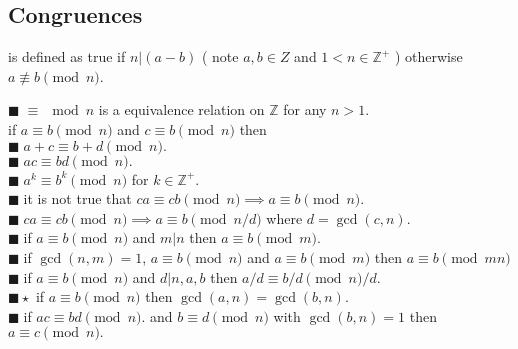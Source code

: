 \documentclass[11pt]{extarticle}
\newcommand{\Z}{\mathbb{Z}}
\newcommand{\snote}[1]{{\footnotesize(#1)}}
\newcommand{\tbx}[2][]{
\begin{tcolorbox}[enhanced,breakable,size=small,colback=black!2!white,title={#1},arc is angular, arc=1.5mm,
	drop fuzzy shadow]
	#2
\end{tcolorbox}
}
\newcommand{\y}{$\blacksquare\;$}
\begin{document}
\begin{multicols}{2}
\section{Congruences}
\tbx[$ a\equiv b\pmod{n} $]{ is defined as true if $ n|(a-b) $ \snote{ note $ a,b\in Z $ and $ 1<n\in \Z^+ $
} otherwise $ a\not\equiv b\pmod{n}  $.  }
\tbx[properties]{  
\y $ \equiv \mod{n}$ is a equivalence relation on $ \Z $ for any $ n>1. $ \\
if $ a\equiv b \pmod n $ and $ c\equiv b\pmod n $ then\\
\y $ a+c \equiv  b+d \pmod n.$ \\
\y $ ac\equiv bd\pmod n. $ \\
\y $ a^k\equiv b^k\pmod{n} $ for $ k\in \Z^+.$\\
\y it is not true that $ ca\equiv cb\pmod n\implies a\equiv b \pmod n $. \\
\y $ ca\equiv cb\pmod n\implies a\equiv b \pmod{n/d} $ where $ d=\gcd(c,n). $ \\
\y if $ a\equiv b\pmod n $ and $ m|n $ then $ a\equiv b \pmod m. $\\
\y if $ \gcd(n,m)=1 $, $ a\equiv b\pmod{n} $ and   $ a\equiv b\pmod{m} $ then $ a\equiv b \pmod{mn} $ \\ 
 \y if $ a\equiv b\pmod n $ and $ d|n,a,b $ then $ a/d\equiv b/d \pmod n/d. $\\
 $ \blacksquare\star$     if $ a\equiv b\pmod n $ then $ \gcd(a,n)=\gcd(b,n) .$\\
  \y if $ ac\equiv bd\pmod n. $ and $ b\equiv d\pmod n $ with $ \gcd(b,n)=1 $ then $ a\equiv c\pmod{n}. $  }

\end{multicols}
\end{document}
